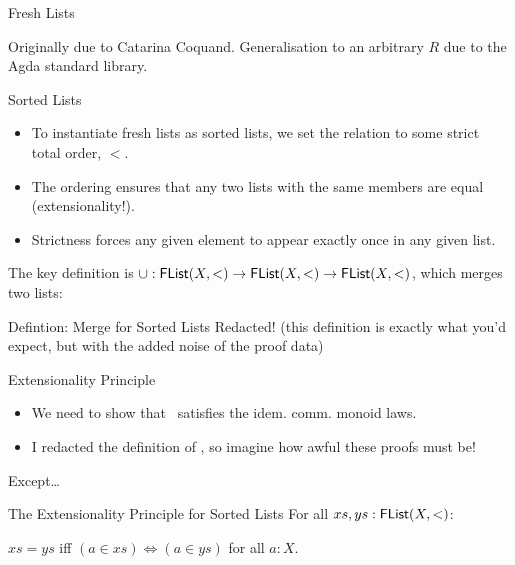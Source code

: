 \documentclass[handout]{beamer}
\newcommand{\union}{\AgdaFunction{$\cup$}}
\begin{document}
\begin{frame}{Fresh Lists}
  \snippetdatafreshlist{}

  Originally due to Catarina Coquand.
  Generalisation to an arbitrary $R$ due to the Agda standard library.
\end{frame}


\begin{frame}{Sorted Lists}

\begin{itemize}
  \item To instantiate fresh lists as sorted lists, we set the relation to some strict total order, $<$.

  \item The ordering ensures that any two lists with the same members are equal (extensionality!).

  \item Strictness forces any given element to appear exactly once in any given list.
\end{itemize}

  The key definition is $\union : \AgdaDatatype{FList}(X,<) \to \AgdaDatatype{FList}(X,<) \to \AgdaDatatype{FList}(X,<)$, which merges two lists:

  \begin{block}{Defintion: Merge for Sorted Lists}
    Redacted! (this definition is exactly what you'd expect, but with the added noise of the proof data)
  \end{block}
\end{frame}


\begin{frame}{Extensionality Principle}
\begin{itemize}
  \item We need to show that \union~satisfies the idem. comm. monoid laws.
  \item I redacted the definition of \union, so imagine how awful these proofs must be!
\end{itemize}

\begin{center}
  Except\ldots{}
\end{center}

\begin{block}{The Extensionality Principle for Sorted Lists}
  For all $xs, ys : \AgdaDatatype{FList}(X,<)$:

  \begin{center}
    $xs = ys$ iff $(a \in xs) \iff (a \in ys)$ for all $a : X$.
  \end{center}
\end{block}
\end{frame}
\end{document}
